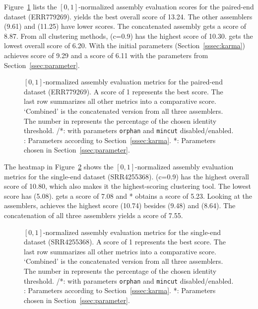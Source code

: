 \documentclass[12pt,a4paper,english]{article}
\begin{document}
	\newpage
	Figure~\ref{img:eco_pe} lists the $[0,1]$-normalized assembly evaluation scores for the paired-end \ecoli dataset (ERR779269). \soap yields the best overall score of 13.24. The other assemblers \spades (9.61) and \trinity (11.25) have lower scores. The concatenated assembly gets a score of 8.87. From all clustering methods, \cdhit (c=0.9) has the highest score of 10.30. \grouper gets the lowest overall score of 6.20. With the initial parameters (Section~\ref{sssec:karma}) \karma achieves score of 9.29 and a score of 6.11 with the parameters from Section~\ref{ssec:parameter}.\\
		
	\begin{figure}[H]
		\hspace{-13pt}
		\def\svgwidth{1.1\textwidth}
		
		\caption[Normalized assembly evaluation metrics (\ecoli, PE, ERR779269).]{$[0,1]$-normalized assembly evaluation metrics for the paired-end \ecoli dataset (ERR779269). A score of 1 represents the best score. The last row summarizes all other metrics into a comparative score. `Combined' is the concatenated version from all three assemblers. The number in \cdhit represents the percentage of the chosen identity threshold. \grouper/\grouper{}*: \grouper with parameters \texttt{orphan} and \texttt{mincut} disabled/enabled. \karma: Parameters according to Section~\ref{sssec:karma}. \karma{}*: Parameters chosen in Section~\ref{ssec:parameter}.}
		\label{img:eco_pe}
	\end{figure}


	\newpage
    The heatmap in Figure~\ref{img:eco_se} shows the $[0,1]$-normalized assembly evaluation metrics for the single-end \ecoli dataset (SRR4255368). \cdhit (c=0.9) has the highest overall score of 10.80, which also makes it the highest-scoring clustering tool. The lowest score has \grouper (5.08). \karma gets a score of 7.08  and \karma{}* obtains a score of 5.23.
	Looking at the assemblers, \soap achieves the highest score (10.74) besides \spades (9.48) and \trinity (8.64). The concatenation of all three assemblers yields a score of 7.55.
	

	\begin{figure}[H]
		\hspace{-13pt}
		\def\svgwidth{1.1\textwidth}
		
		\caption[Normalized assembly evaluation metrics (\ecoli, SE, SRR4255368).]{$[0,1]$-normalized assembly evaluation metrics for the single-end \ecoli dataset (SRR4255368). A score of 1 represents the best score. The last row summarizes all other metrics into a comparative score. `Combined' is the concatenated version from all three assemblers. The number in \cdhit represents the percentage of the chosen identity threshold. \grouper/\grouper{}*: \grouper with parameters \texttt{orphan} and \texttt{mincut} disabled/enabled. \karma: Parameters according to Section~\ref{sssec:karma}. \karma{}*: Parameters chosen in Section~\ref{ssec:parameter}.}
		\label{img:eco_se}
	\end{figure}
\end{document}
